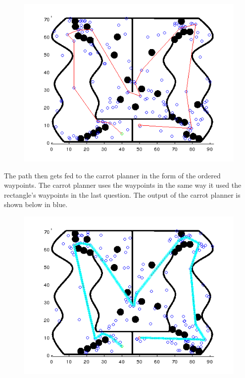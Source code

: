 \documentclass[12pt]{article}
\begin{document}
\begin{figure}[ht]
\hspace{0.5cm}
\centering
\includegraphics[scale=0.5]{Pictures/path_1.png}
\end{figure}
The path then gets fed to the carrot planner in the form of the ordered waypoints. The carrot planner uses the waypoints in the same way it used the rectangle's waypoints in the last question. The output of the carrot planner is shown below in blue.
\begin{figure}[ht]
\hspace{0.5cm}
\centering
\includegraphics[scale=0.5]{Pictures/maptraversesim.png}
\end{figure}
\newpage
\singlespacing
\end{document}
